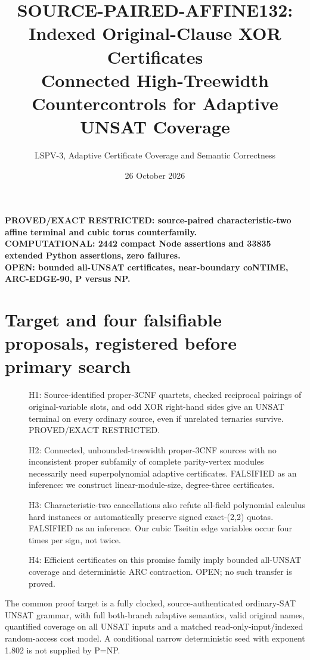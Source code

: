 \documentclass[11pt]{article}
\title{SOURCE-PAIRED-AFFINE132: Indexed Original-Clause XOR Certificates\\Connected High-Treewidth Countercontrols for Adaptive UNSAT Coverage}
\author{LSPV-3, Adaptive Certificate Coverage and Semantic Correctness}
\date{26 October 2026}
\begin{document}
\maketitle
\begin{center}
\textbf{PROVED/EXACT RESTRICTED: source-paired characteristic-two affine terminal and cubic torus counterfamily.}\\
\textbf{COMPUTATIONAL: 2442 compact Node assertions and 33835 extended Python assertions, zero failures.}\\
\textbf{OPEN: bounded all-UNSAT certificates, near-boundary coNTIME, ARC-EDGE-90, P versus NP.}
\end{center}
\section{Target and four falsifiable proposals, registered before primary search}
\begin{description}
\item[] H1: Source-identified proper-3CNF quartets, checked reciprocal pairings of original-variable slots, and odd XOR right-hand sides give an UNSAT terminal on every ordinary source, even if unrelated ternaries survive. PROVED/EXACT RESTRICTED.
\item[] H2: Connected, unbounded-treewidth proper-3CNF sources with no inconsistent proper subfamily of complete parity-vertex modules necessarily need superpolynomial adaptive certificates. FALSIFIED as an inference: we construct linear-module-size, degree-three certificates.
\item[] H3: Characteristic-two cancellations also refute all-field polynomial calculus hard instances or automatically preserve signed exact-(2,2) quotas. FALSIFIED as an inference. Our cubic Tseitin edge variables occur four times per sign, not twice.
\item[] H4: Efficient certificates on this promise family imply bounded all-UNSAT coverage and deterministic ARC contraction. OPEN; no such transfer is proved.
\end{description}
The common proof target is a fully clocked, source-authenticated ordinary-SAT UNSAT grammar, with full both-branch adaptive semantics, valid original names, quantified coverage on all UNSAT inputs and a matched read-only-input/indexed random-access cost model. A conditional narrow deterministic seed with exponent 1.802 is not supplied by P=NP.
\end{document}
